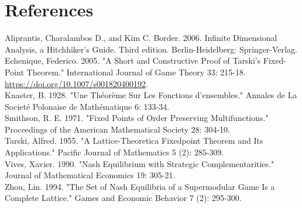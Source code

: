 \documentclass[10pt]{article}
\begin{document}
\section*{References}
Aliprantis, Charalambos D., and Kim C. Border. 2006. Infinite Dimensional Analysis, a Hitchhiker's Guide. Third edition. Berlin-Heidelberg: Springer-Verlag.\\
Echenique, Federico. 2005. "A Short and Constructive Proof of Tarski's Fixed-Point Theorem." International Journal of Game Theory 33: 215-18. \href{https://doi.org/10.1007/s001820400192}{https://doi.org/10.1007/s001820400192}.\\
Knaster, B. 1928. "Une Théorème Sur Les Fonctions d'ensembles." Annales de La Societé Polonaise de Mathématique 6: 133-34.\\
Smithson, R. E. 1971. "Fixed Points of Order Preserving Multifunctions." Proceedings of the American Mathematical Society 28: 304-10.\\
Tarski, Alfred. 1955. "A Lattice-Theoretica Fixedpoint Theorem and Its Applications." Pacific Journal of Mathematics 5 (2): 285-309.\\
Vives, Xavier. 1990. "Nash Equilibrium with Strategic Complementarities." Journal of Mathematical Economics 19: 305-21.\\
Zhou, Lin. 1994. "The Set of Nash Equilibria of a Supermodular Game Is a Complete Lattice." Games and Economic Behavior 7 (2): 295-300.
\end{document}

